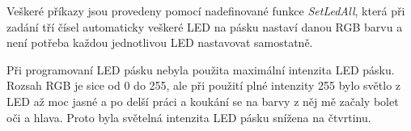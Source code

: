 Veškeré příkazy jsou provedeny pomocí nadefinované funkce \textit{SetLedAll}, která při zadání tří čísel automaticky veškeré LED na pásku nastaví danou RGB barvu a není potřeba každou jednotlivou LED nastavovat samostatně. 

Při programovaní LED pásku nebyla použita maximální intenzita LED pásku. Rozsah RGB je sice od 0 do 255, ale při použití plné intenzity 255 bylo světlo z LED až moc jasné a po delší práci a koukání se na barvy z něj mě začaly bolet oči a hlava. Proto byla světelná intenzita LED pásku snížena na čtvrtinu. 
\newpage